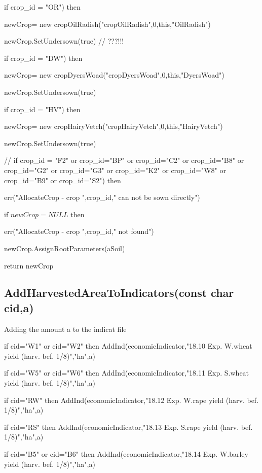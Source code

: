 \documentclass[%
]{scrartcl}
\begin{document}
{{{   if crop\_id = "OR") then
 
   \quad     newCrop= new cropOilRadish("cropOilRadish",0,this,"OilRadish")
    
\quad    newCrop.SetUndersown(true)  // ???!!!
  
   if crop\_id = "DW") then
   
  \quad      newCrop= new cropDyersWoad("cropDyersWoad",0,this,"DyersWoad")
    
\quad    newCrop.SetUndersown(true)
  
   if crop\_id = "HV") then
	
     \quad   newCrop= new cropHairyVetch("cropHairyVetch",0,this,"HairyVetch")
     
 \quad  newCrop.SetUndersown(true)
   
    //
   if crop\_id = "F2" or crop\_id="BP" or crop\_id="C2"
       or crop\_id="B8" or crop\_id="G2" or crop\_id="G3"
       or crop\_id="K2" or crop\_id="W8"
       or crop\_id="B9"  or crop\_id="S2") then
   
  \quad   err("AllocateCrop - crop ",crop\_id," can not be sown directly")
  
 if $newCrop=NULL$ then

 \quad       err("AllocateCrop - crop ",crop\_id," not found")

   newCrop.AssignRootParameters(aSoil)

   return newCrop


\subsection{AddHarvestedAreaToIndicators(const char cid,a)}

Adding the amount a to the indicat file

   if cid="W1" or cid="W2" then
          AddInd(economicIndicator,"18.10 Exp. W.wheat yield (harv. bef. 1/8)","ha",a)
	
	if cid="W5" or cid="W6" then	
       AddInd(economicIndicator,"18.11 Exp. S.wheat yield (harv. bef. 1/8)","ha",a)
 
   if cid="RW" then      
       AddInd(economicIndicator,"18.12 Exp. W.rape yield (harv. bef. 1/8)","ha",a)
  
   if cid="RS" then      
       AddInd(economicIndicator,"18.13 Exp. S.rape yield (harv. bef. 1/8)","ha",a)
  
   if cid="B5" or cid="B6" then   
       AddInd(economicIndicator,"18.14 Exp. W.barley yield (harv. bef. 1/8)","ha",a)
  
}}}
\end{document}
